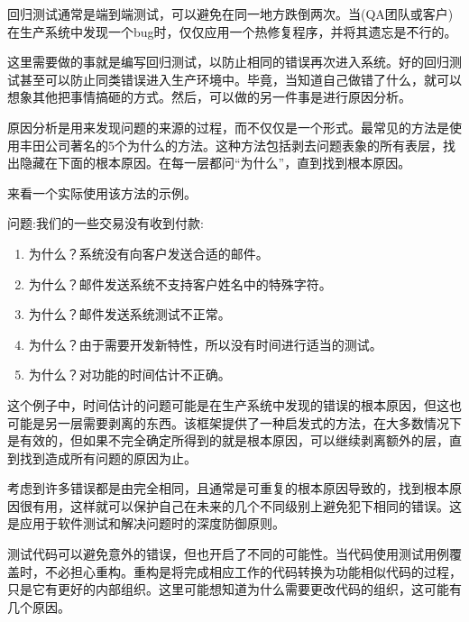 
回归测试通常是端到端测试，可以避免在同一地方跌倒两次。当(QA团队或客户)在生产系统中发现一个bug时，仅仅应用一个热修复程序，并将其遗忘是不行的。

这里需要做的事就是编写回归测试，以防止相同的错误再次进入系统。好的回归测试甚至可以防止同类错误进入生产环境中。毕竟，当知道自己做错了什么，就可以想象其他把事情搞砸的方式。然后，可以做的另一件事是进行原因分析。


原因分析是用来发现问题的来源的过程，而不仅仅是一个形式。最常见的方法是使用丰田公司著名的5个为什么的方法。这种方法包括剥去问题表象的所有表层，找出隐藏在下面的根本原因。在每一层都问“为什么”，直到找到根本原因。

来看一个实际使用该方法的示例。

问题:我们的一些交易没有收到付款:

\begin{enumerate}
\item 
为什么？系统没有向客户发送合适的邮件。

\item 
为什么？邮件发送系统不支持客户姓名中的特殊字符。

\item 
为什么？邮件发送系统测试不正常。

\item 
为什么？由于需要开发新特性，所以没有时间进行适当的测试。

\item 
为什么？对功能的时间估计不正确。
\end{enumerate}

这个例子中，时间估计的问题可能是在生产系统中发现的错误的根本原因，但这也可能是另一层需要剥离的东西。该框架提供了一种启发式的方法，在大多数情况下是有效的，但如果不完全确定所得到的就是根本原因，可以继续剥离额外的层，直到找到造成所有问题的原因为止。

考虑到许多错误都是由完全相同，且通常是可重复的根本原因导致的，找到根本原因很有用，这样就可以保护自己在未来的几个不同级别上避免犯下相同的错误。这是应用于软件测试和解决问题时的深度防御原则。


测试代码可以避免意外的错误，但也开启了不同的可能性。当代码使用测试用例覆盖时，不必担心重构。重构是将完成相应工作的代码转换为功能相似代码的过程，只是它有更好的内部组织。这里可能想知道为什么需要更改代码的组织，这可能有几个原因。

